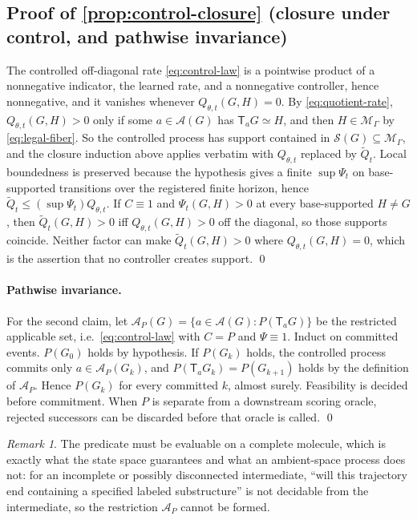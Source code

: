 \documentclass{article}
\newcommand{\M}{\mathcal{M}_{\Gamma}}
\newcommand{\A}{\mathcal{A}}
\newcommand{\Sset}{\mathcal{S}}
\newcommand{\T}{\mathsf{T}}
\theoremstyle{definition}
\theoremstyle{remark}
\newtheorem{remark}[theorem]{Remark}
\begin{document}
\subsection{Proof of \cref{prop:control-closure} (closure under control, and pathwise invariance)}

The controlled off-diagonal rate \eqref{eq:control-law} is a pointwise product of a nonnegative indicator, the learned rate, and a nonnegative controller, hence nonnegative, and it vanishes whenever $Q_{\theta,t}(G,H)=0$. By \eqref{eq:quotient-rate}, $Q_{\theta,t}(G,H)>0$ only if some $a\in\A(G)$ has $\T_aG\simeq H$, and then $H\in\M$ by \eqref{eq:legal-fiber}. So the controlled process has support contained in $\Sset(G)\subseteq\M$, and the closure induction above applies verbatim with $Q_{\theta,t}$ replaced by $\widetilde Q_t$. Local boundedness is preserved because the hypothesis gives a finite $\sup\Psi_t$ on base-supported transitions over the registered finite horizon, hence $\widetilde Q_t\le(\sup\Psi_t)Q_{\theta,t}$. If $C\equiv1$ and $\Psi_t(G,H)>0$ at every base-supported $H\neq G$, then $\widetilde Q_t(G,H)>0$ iff $Q_{\theta,t}(G,H)>0$ off the diagonal, so those supports coincide. Neither factor can make $\widetilde Q_t(G,H)>0$ where $Q_{\theta,t}(G,H)=0$, which is the assertion that no controller creates support. \qed

\paragraph{Pathwise invariance.}

For the second claim, let $\A_P(G)=\{a\in\A(G):P(\T_aG)\}$ be the restricted applicable set, i.e.\ \eqref{eq:control-law} with $C=P$ and $\Psi\equiv1$. Induct on committed events. $P(G_0)$ holds by hypothesis. If $P(G_k)$ holds, the controlled process commits only $a\in\A_P(G_k)$, and $P(\T_aG_k)=P(G_{k+1})$ holds by the definition of $\A_P$. Hence $P(G_k)$ for every committed $k$, almost surely. Feasibility is decided before commitment. When $P$ is separate from a downstream scoring oracle, rejected successors can be discarded before that oracle is called. \qed

\begin{remark}
The predicate must be evaluable on a complete molecule, which is exactly what the state space guarantees and what an ambient-space process does not: for an incomplete or possibly disconnected intermediate, ``will this trajectory end containing a specified labeled substructure'' is not decidable from the intermediate, so the restriction $\A_P$ cannot be formed.
\end{remark}
\end{document}
